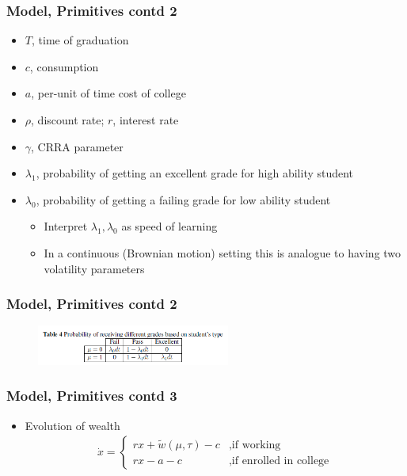 \begin{frame}
	\frametitle{Model, Primitives contd 2}
		\begin{itemize}
			\item $T$, time of graduation
			\item $c$, consumption
			\item $a$, per-unit of time cost of college
			\item $\rho$, discount rate; $r$, interest rate
			\item $\gamma$, CRRA parameter
			\item $\lambda_{1}$, probability of getting an excellent grade for high ability student
			\item $\lambda_{0}$, probability of getting a failing grade for low ability student
				\begin{itemize}
					\item Interpret $\lambda_{1},\lambda_{0}$ as speed of learning
					\item In a continuous (Brownian motion) setting this is analogue to having two volatility parameters
				\end{itemize}
		\end{itemize}
\end{frame}

\begin{frame}
	\frametitle{Model, Primitives contd 2}
		\begin{figure}[H] 
		\caption*{}
		\centering
		\includegraphics[width=2.5in, height=.5in]{Figures/OT/table4.png}
		\end{figure}
\end{frame}

\begin{frame}
	\frametitle{Model, Primitives contd 3}
		\begin{itemize}
			\item Evolution of wealth
				\begin{eqnarray}
					\dot{x} = 
						\begin{cases}
							rx + \tilde{w}(\mu, \tau) - c &, \text{if working} \\
							rx - a - c &, \text{if enrolled in college} \label{eq:x}
						\end{cases}
				\end{eqnarray}
		\end{itemize}
\end{frame}


